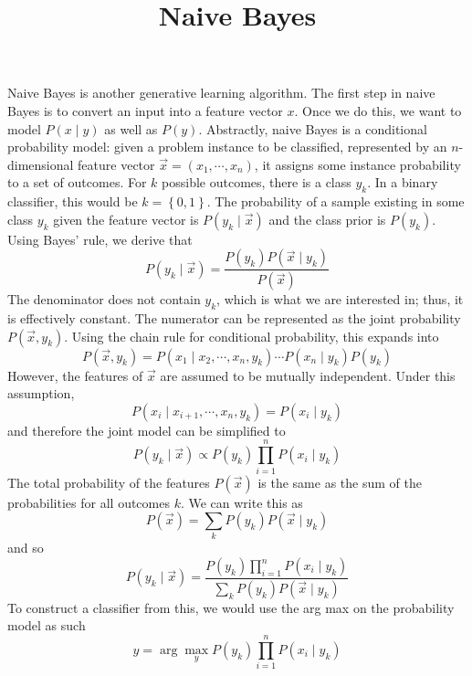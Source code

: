 \documentclass[11pt]{article}
\title{Naive Bayes}
\author{}
\date{}
\begin{document}
\maketitle
\vspace{-1.2em}
Naive Bayes is another generative learning algorithm. The first step in naive Bayes is to convert an input into a feature vector $x$. Once we do this, we want to model $P(x \mid y)$ as well as $P(y)$. Abstractly, naive Bayes is a conditional probability model: given a problem instance to be classified, represented by an $n$-dimensional feature vector $\vec{x} = \left(x_1,\cdots,x_n\right)$, it assigns some instance probability to a set of outcomes. For $k$ possible outcomes, there is a class $y_k$. In a binary classifier, this would be $k=\left \{ 0,1 \right \}$. The probability of a sample existing in some class $y_k$ given the feature vector is $P\left(y_k \mid \vec{x}\right)$ and the class prior is $P(y_k)$. Using Bayes' rule, we derive that
$$P(y_k \mid \vec{x}) = \frac{P(y_k)P(\vec{x} \mid y_k)}{P(\vec{x})}$$
The denominator does not contain $y_k$, which is what we are interested in; thus, it is effectively constant. The numerator can be represented as the joint probability $P(\vec{x}, y_k)$. Using the chain rule for conditional probability, this expands into
$$P(\vec{x}, y_k) = P(x_1 \mid x_2,\cdots,x_n, y_k)\cdots P(x_n \mid y_k)P(y_k)$$
However, the features of $\vec{x}$ are assumed to be mutually independent. Under this assumption,
$$P(x_i \mid x_{i+1},\cdots,x_n, y_k) = P(x_i \mid y_k)$$
and therefore the joint model can be simplified to
$$P(y_k \mid \vec{x}) \propto P(y_k) \prod_{i=1}^{n} P(x_i \mid y_k)$$
The total probability of the features $P(\vec{x})$ is the same as the sum of the probabilities for all outcomes $k$. We can write this as
$$P(\vec{x}) = \sum_{k} P(y_k)P(\vec{x} \mid y_k)$$
and so
$$P(y_k \mid \vec{x}) = \frac{P(y_k) \prod_{i=1}^{n} P(x_i \mid y_k)}{\sum_{k} P(y_k)P(\vec{x} \mid y_k)}$$
To construct a classifier from this, we would use the arg max on the probability model as such
$$y = \arg{\max_y P(y_k) \prod_{i=1}^{n} P(x_i \mid y_k)}$$
\end{document}
